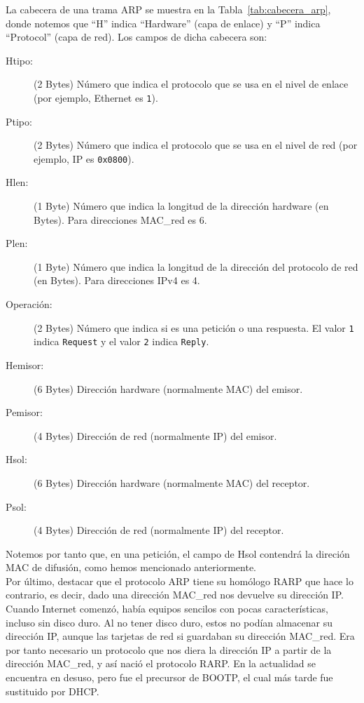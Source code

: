 La cabecera de una trama \acrshort{ARP} se muestra en la Tabla~\ref{tab:cabecera_arp}, donde notemos que ``H'' indica ``Hardware'' (capa de enlace) y ``P'' indica ``Protocol'' (capa de red). Los campos de dicha cabecera son:
\begin{description}
    \item[Htipo:] (2 Bytes) Número que indica el protocolo que se usa en el nivel de enlace (por ejemplo, Ethernet es \verb|1|).
    \item[Ptipo:] (2 Bytes) Número que indica el protocolo que se usa en el nivel de red (por ejemplo, \acrshort{IP} es \verb|0x0800|).
    \item[Hlen:] (1 Byte) Número que indica la longitud de la dirección hardware (en Bytes). Para direcciones \acrshort{MAC_red} es 6.
    \item[Plen:] (1 Byte) Número que indica la longitud de la dirección del protocolo de red (en Bytes). Para direcciones \acrshort{IPv4} es 4.
    \item[Operación:] (2 Bytes) Número que indica si es una petición o una respuesta. El valor \verb|1| indica \verb|Request| y el valor \verb|2| indica \verb|Reply|.
    \item[Hemisor:] (6 Bytes) Dirección hardware (normalmente MAC) del emisor.
    \item[Pemisor:] (4 Bytes) Dirección de red (normalmente IP) del emisor.
    \item[Hsol:] (6 Bytes) Dirección hardware (normalmente MAC) del receptor.
    \item[Psol:] (4 Bytes) Dirección de red (normalmente IP) del receptor.
\end{description}

Notemos por tanto que, en una petición, el campo de Hsol contendrá la direción \acrshort{MAC} de difusión, como hemos mencionado anteriormente.\\

Por último, destacar que el protocolo \acrshort{ARP} tiene su homólogo \acrfull{RARP} que hace lo contrario, es decir, dado una dirección \acrshort{MAC_red} nos devuelve su dirección IP\@. Cuando Internet comenzó, había equipos sencilos con pocas características, incluso sin disco duro. Al no tener disco duro, estos no podían almacenar su dirección IP, aunque las tarjetas de red si guardaban su dirección \acrshort{MAC_red}. Era por tanto necesario un protocolo que nos diera la dirección IP a partir de la dirección \acrshort{MAC_red}, y así nació el protocolo \acrshort{RARP}. En la actualidad se encuentra en desuso, pero fue el precursor de \acrshort{BOOTP}, el cual más tarde fue sustituido por \acrshort{DHCP}.


